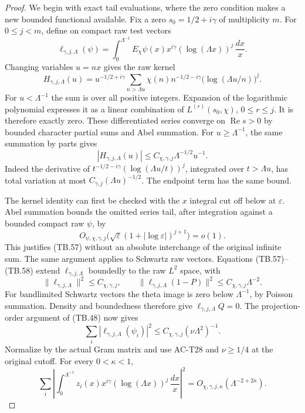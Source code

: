 \begin{proof}
We begin with exact tail evaluations, where the zero
condition makes a new bounded functional available.
Fix a zero \(s_0=1/2+i\gamma\) of multiplicity \(m\).
For \(0\leq j<m\), define on compact raw test vectors
\[
 \ell_{\gamma,j,\Lambda}(\psi)
   =\int_0^{\Lambda^{-1}}E_\chi\psi(x)x^{i\gamma}
                         (\log(\Lambda x))^j\,\frac{dx}{x}.
 \tag{TB.56}
\]
Changing variables \(u=nx\) gives the raw kernel
\[
 H_{\gamma,j,\Lambda}(u)=u^{-1/2+i\gamma}
       \sum_{n>\Lambda u}\chi(n)n^{-1/2-i\gamma}
                                  \bigl(\log(\Lambda u/n)\bigr)^j .
 \tag{TB.57}
\]
For \(u<\Lambda^{-1}\) the sum is over all positive integers.
Expansion of the logarithmic polynomial expresses it as a
linear combination of \(L^{(r)}(s_0,\chi)\), \(0\leq r\leq j\).
It is therefore exactly zero.  These differentiated series
converge on \(\operatorname{Re}s>0\) by bounded character
partial sums and Abel summation.
For \(u\geq\Lambda^{-1}\), the same summation by parts gives
\[
 |H_{\gamma,j,\Lambda}(u)|
                       \leq C_{\chi,\gamma,j}\Lambda^{-1/2}u^{-1}.
 \tag{TB.58}
\]
Indeed the derivative of
\(t^{-1/2-i\gamma}(\log(\Lambda u/t))^j\), integrated over
\(t>\Lambda u\), has total variation at most
\(C_{\gamma,j}(\Lambda u)^{-1/2}\).
The endpoint term has the same bound.

The kernel identity can first be checked with the \(x\)
integral cut off below at \(\varepsilon\).
Abel summation bounds the omitted series tail, after
integration against a bounded compact raw \(\psi\), by
\[
 O_{\psi,\chi,\gamma,j}
       \bigl(\sqrt\varepsilon
                         (1+|\log\varepsilon|)^{j+1}\bigr)=o(1).
\]
This justifies (TB.57) without an absolute interchange of the
original infinite sum.  The same argument applies to
Schwartz raw vectors.  Equations (TB.57)--(TB.58) extend
\(\ell_{\gamma,j,\Lambda}\) boundedly to the raw \(L^2\) space,
with
\[
 \|\ell_{\gamma,j,\Lambda}\|^2\leq C_{\chi,\gamma,j},
 \qquad
 \|\ell_{\gamma,j,\Lambda}(1-P)\|^2
                             \leq C_{\chi,\gamma,j}\Lambda^{-2}.
 \tag{TB.59}
\]
For bandlimited Schwartz vectors the theta image is zero
below \(\Lambda^{-1}\), by Poisson summation.
Density and boundedness therefore give
\(\ell_{\gamma,j,\Lambda}Q=0\).
The projection-order argument of (TB.48) now gives
\[
 \sum_i|\ell_{\gamma,j,\Lambda}(\psi_i)|^2
                    \leq C_{\chi,\gamma,j}(\nu\Lambda^2)^{-1}.
\]
Normalize by the actual Gram matrix and use AC-T28 and
\(\nu\geq1/4\) at the original cutoff.  For every
\(0<\kappa<1\),
\[
 \sum_i\left|
     \int_0^{\Lambda^{-1}}z_i(x)x^{i\gamma}
                         (\log(\Lambda x))^j\,\frac{dx}{x}
                         \right|^2
          =O_{\chi,\gamma,j,\kappa}(\Lambda^{-2+2\kappa}).
 \tag{TB.60}
\]


\end{proof}
